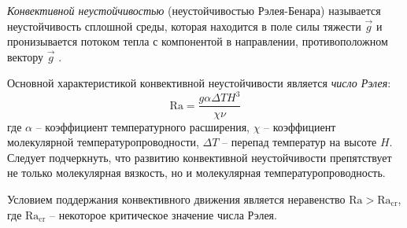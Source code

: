 \textit{Конвективной неустойчивостью} (неустойчивостью Рэлея-Бенара) называется неустойчивость сплошной среды, которая находится в поле силы тяжести $\vec{g}$ и пронизывается потоком тепла с компонентой в
направлении, противоположном вектору $\vec{g}$ \cite{Носов-2013}.

Основной характеристикой конвективной неустойчивости является \textit{число Рэлея}:
\begin{equation}
\text{Ra}=\frac{g\alpha\Delta TH^3}{\chi\nu}
\end{equation}
где $\alpha$ -- коэффициент температурного расширения, $\chi$ -- коэффициент молекулярной температуропроводности, $\Delta T$ -- перепад температур на высоте $H$.
Следует подчеркнуть, что развитию конвективной неустойчивости препятствует не только молекулярная вязкость, но и молекулярная температуропроводность.

Условием поддержания конвективного движения является неравенство $\text{Ra}>\text{Ra}_\text{cr}$, где $\text{Ra}_\text{cr}$ -- некоторое критическое значение числа Рэлея.
